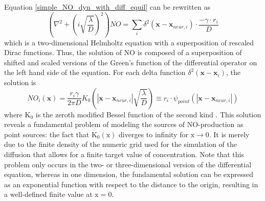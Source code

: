 \documentclass[10pt,a4paper]{article}
\begin{document}
Equation \eqref{simple_NO_dyn_with_diff_equil} can be rewritten as
\begin{equation}
\left(\nabla^2 + \left( i\sqrt{\frac{\lambda}{D}}\right)^2\right) NO = \sum_{i} \delta^2(\mathbf{x}-\mathbf{x}_{neur,i})\cdot \frac{- \gamma \cdot r_i}{D}
\label{simple_NO_dyn_with_diff_equil_helmholtz}
\end{equation}
which is a two-dimensional Helmholtz equation with a superposition of rescaled Dirac functions. Thus, the solution of $\mathrm{NO}$ is composed of a superposition of shifted and scaled versions of the Green's function of the differential operator on the left hand side of the equation. For each delta function $\delta^2(\mathbf{x}-\mathbf{x}_i)$, the solution is
\begin{equation}
NO_i(\mathbf{x}) = \frac{r_i \gamma}{2 \pi D} K_0 \left(|\mathbf{x}-\mathbf{x}_{neur,i}|\sqrt{\frac{\lambda}{D}} \right) \equiv r_i \cdot \psi_{point}(|\mathbf{x}-\mathbf{x}_{neur,i}|)
\label{solution_diff_equil_bessel}
\end{equation}
where $\mathrm{K_0}$ is the zeroth modified Bessel function of the second kind \cite{Helmholtz_Solution_2d}. This solution reveals a fundamental problem of modeling the sources of NO-production as point sources: the fact that $\mathrm{K_0(x)}$ diverges to infinity for $\mathrm{x\rightarrow 0}$. It is merely due to the finite density of the numeric grid used for the simulation of the diffusion that allows for a finite target value of concentration. Note that this problem only occurs in the two- or three-dimensional version of the differential equation, whereas in one dimension, the fundamental solution can be expressed as an exponential function with respect to the distance to the origin, resulting in a well-defined finite value at $\mathrm{x=0}$.
\end{document}
